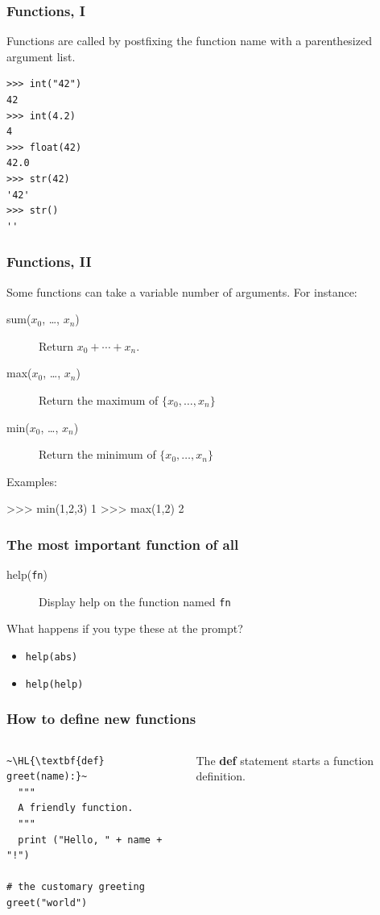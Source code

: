 \documentclass[english,serif,mathserif,xcolor=pdftex,dvipsnames,table]{beamer}
\begin{document}
\begin{frame}[fragile,label=func1]
  \frametitle{Functions, I}
  Functions are called by postfixing the function name with a
  parenthesized argument list.

  \+
\begin{lstlisting}
>>> int("42")
42
>>> int(4.2)
4
>>> float(42)
42.0
>>> str(42)
'42'
>>> str()
''
\end{lstlisting}
\end{frame}


\begin{frame}[fragile]
  \frametitle{Functions, II}
  Some functions can take a variable number of arguments. For instance:

  \+
  \begin{description}
    \item[sum($x_0$, \ldots, $x_n$)] Return $x_0 + \cdots + x_n$.
    \item[max($x_0$, \ldots, $x_n$)] Return the maximum of $\{ x_0, \ldots, x_n \}$
    \item[min($x_0$, \ldots, $x_n$)] Return the minimum of $\{ x_0, \ldots, x_n \}$
  \end{description}

  \+
  Examples:
\begin{semiverbatim}
>>> min(1,2,3)
1
>>> max(1,2)
2
\end{semiverbatim}
\end{frame}


\begin{frame}[fragile]
  \frametitle{The most important function of all}
  \begin{description}
  \item[help(\texttt{fn})] Display help on the function named \texttt{fn}
  \end{description}

  \+
  \begin{question}
    What happens if you type these at the prompt?
    \begin{itemize}
    \item \texttt{help(abs)}
    \item \texttt{help(help)}
    \end{itemize}
  \end{question}
\end{frame}


\begin{frame}[fragile]
  \frametitle{How to define new functions}
  \begin{columns}[t]
    \begin{column}{0.5\textwidth}
\begin{lstlisting}
~\HL{\textbf{def} greet(name):}~
  """
  A friendly function.
  """
  print ("Hello, " + name + "!")

# the customary greeting
greet("world")
\end{lstlisting}
    \end{column}
    \begin{column}{0.5\textwidth}
      \raggedleft
      The \textbf{def} statement starts a function definition.
    \end{column}
  \end{columns}
\end{frame}
\end{document}
